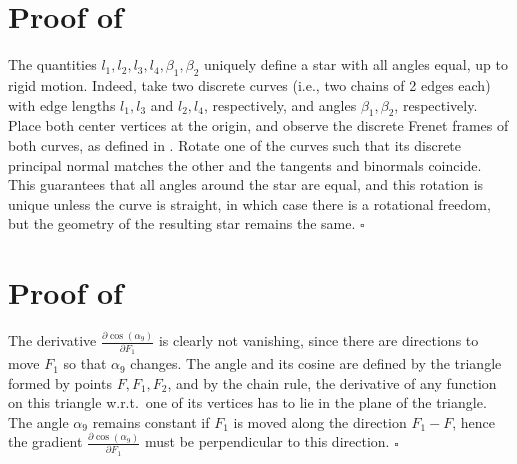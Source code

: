 \appendix

\section{Proof of } \label{appendix:single_star_proof}
The quantities $l_1,l_2,l_3,l_4,\beta_1,\beta_2$ uniquely define a star with all angles equal, up to rigid motion. Indeed, take two discrete curves (i.e., two chains of 2 edges each) with edge lengths $l_1, l_3$ and $l_2,l_4$, respectively, and angles $\beta_1, \beta_2$, respectively. Place both center vertices at the origin, and observe the discrete Frenet frames of both curves, as defined in \cite{rabi18}. Rotate one of the curves such that its discrete principal normal matches the other and the tangents and binormals coincide. This  guarantees that all angles around the star are equal, and this rotation is unique unless the curve is straight, in which case there is a rotational freedom, but the geometry of the resulting star remains the same. \hfill$\square$

\section{Proof of } \label{appendix:angle_grad_proof}
The derivative $\frac{\partial\cos(\alpha_9)}{\partial F_1}$ is clearly not vanishing, since there are directions to move $F_1$ so that $\alpha_9$ changes. The angle and its cosine are defined by the triangle formed by points $F, F_1, F_2$, and by the chain rule, the derivative of any function on this triangle w.r.t.\ one of its vertices has to lie in the plane of the triangle. The angle $\alpha_9$ remains constant if $F_1$ is moved along the direction $F_1-F$, hence the gradient $\frac{\partial\cos(\alpha_9)}{\partial F_1}$ must be perpendicular to this direction.  \hfill$\square$




